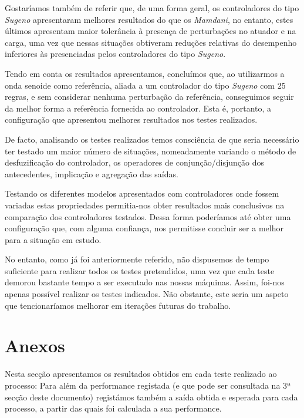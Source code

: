 \documentclass{article}
\begin{document}
Gostaríamos também de referir que, de uma forma geral, os controladores do tipo \emph{Sugeno} apresentaram melhores resultados do que os \emph{Mamdani}, no entanto, estes últimos apresentam maior tolerância à presença de perturbações no atuador e na carga, uma vez que nessas situações obtiveram reduções relativas do desempenho inferiores às presenciadas pelos controladores do tipo \emph{Sugeno}.

Tendo em conta os resultados apresentamos, concluímos que, ao utilizarmos a onda senoide como referência, aliada a um controlador do tipo \emph{Sugeno} com $25$ regras, e sem considerar nenhuma perturbação da referência, conseguimos seguir da melhor forma a referência fornecida ao controlador. Esta é, portanto, a configuração que apresentou melhores resultados nos testes realizados.

De facto, analisando os testes realizados temos consciência de que seria necessário ter testado um maior número de situações, nomeadamente variando o método de desfuzificação do controlador, os operadores de conjunção/disjunção dos antecedentes, implicação e agregação das saídas.

Testando os diferentes modelos apresentados com controladores onde fossem variadas estas propriedades permitia-nos obter resultados mais conclusivos na comparação dos controladores testados. Dessa forma poderíamos até obter uma configuração que, com alguma confiança, nos permitisse concluir ser a melhor para a situação em estudo.

No entanto, como já foi anteriormente referido, não dispusemos de tempo suficiente para realizar todos os testes pretendidos, uma vez que cada teste demorou bastante tempo a ser executado nas nossas máquinas. Assim, foi-nos apenas possível realizar os testes indicados. Não obstante, este seria um aspeto que tencionaríamos melhorar em iterações futuras do trabalho.

\pagebreak

\section{Anexos}

Nesta secção apresentamos os resultados obtidos em cada teste realizado ao processo: Para além da performance registada (e que pode ser consultada na 3ª secção deste documento) registámos também a saída obtida e esperada para cada processo, a partir das quais foi calculada a sua performance.

\vspace{.2cm}
\end{document}

